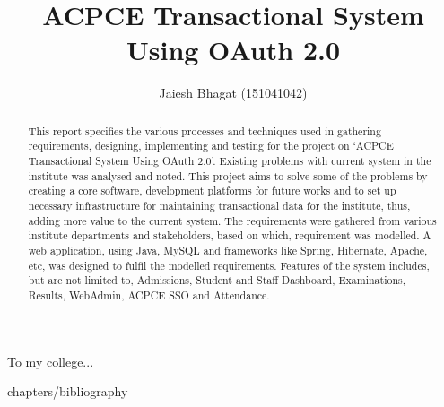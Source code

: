 \documentclass{class/report}
\title{ACPCE Transactional System Using OAuth 2.0}
\author{Jaiesh Bhagat (151041042)}
\begin{document}
\maketitle

\begin{dedication}
To my college...
\end{dedication}

\makecertificate

\makedeclaration

\begin{abstract}
This report specifies the various processes and techniques used in gathering requirements, designing, implementing and testing for the project on ‘ACPCE Transactional System Using OAuth 2.0’. Existing problems with current system in the institute was analysed and noted. This project aims to solve some of the problems by creating a core software, development platforms for future works and to set up necessary infrastructure for maintaining transactional data for the institute, thus, adding more value to the current system. The requirements were gathered from various institute departments and stakeholders, based on which, requirement was modelled. A web application, using Java, MySQL and frameworks like Spring, Hibernate, Apache, etc, was designed to fulfil the modelled requirements. Features of the system includes, but are not limited to, Admissions, Student and Staff Dashboard, Examinations, Results, WebAdmin, ACPCE SSO and Attendance.
\end{abstract}

\tableofcontents
 
\listoffigures
 
\listoftables








{chapters/bibliography}

\makeacknowledgement
\end{document}
